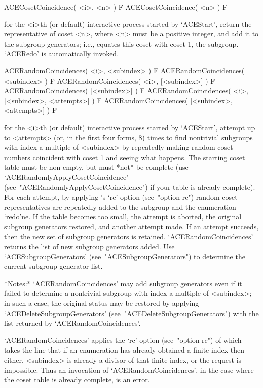 \>ACECosetCoincidence( <i>, <n> ) F
\>ACECosetCoincidence( <n> ) F

for the <i>th (or  default)  interactive  {\ACE}  process  started  by
`ACEStart', return the representative of coset <n>, where <n> must  be
a positive integer, and add  it  to  the  subgroup  generators;  i.e.,
equates  this  coset  with  coset  1,  the  subgroup.   `ACERedo'   is
automatically invoked.

\>ACERandomCoincidences( <i>, <subindex> ) F
\>ACERandomCoincidences( <subindex> ) F
\>ACERandomCoincidences( <i>, [<subindex>] ) F
\>ACERandomCoincidences( [<subindex>] ) F
\>ACERandomCoincidences( <i>, [<subindex>, <attempts>] ) F
\>ACERandomCoincidences( [<subindex>, <attempts>] ) F

for the <i>th (or  default)  interactive  {\ACE}  process  started  by
`ACEStart', attempt up to <attempts> (or, in the first four forms,  8)
times to find nontrivial subgroups with index a multiple of <subindex>
by repeatedly making random coset numbers coincident with coset 1  and
seeing what happens. The starting coset table must be  non-empty,  but
must  *not*  be   complete   (use   `ACERandomlyApplyCosetCoincidence'
(see~"ACERandomlyApplyCosetCoincidence")  if  your  table  is  already
complete).  For  each  attempt,  by  applying  {\ACE}'s  `rc'   option
(see~"option rc") random coset representatives are repeatedly added to
the subgroup and the enumeration `redo'ne. If the  table  becomes  too
small, the  attempt  is  aborted,  the  original  subgroup  generators
restored, and another attempt made. If an attempt succeeds,  then  the
new set of subgroup generators  is  retained.  `ACERandomCoincidences'
returns   the   list   of   new   subgroup   generators   added.   Use
`ACESubgroupGenerators' (see~"ACESubgroupGenerators") to determine the
current subgroup generator list.

*Notes:* 
`ACERandomCoincidences' may add subgroup generators even if it  failed
to  determine  a  nontrivial  subgroup  with  index  a   multiple   of
<subindex>; in such a case, the original status  may  be  restored  by
applying                                 `ACEDeleteSubgroupGenerators'
(see~"ACEDeleteSubgroupGenerators")  with   the   list   returned   by
`ACERandomCoincidences'.

`ACERandomCoincidences' applies the `rc' option (see~"option  rc")  of
{\ACE} which takes  the  line  that  if  an  enumeration  has  already
obtained a finite index then either, <subindex> is already  a  divisor
of that finite index, or the request is impossible. Thus an invocation
of `ACERandomCoincidences', in the  case  where  the  coset  table  is
already complete, is an error.

